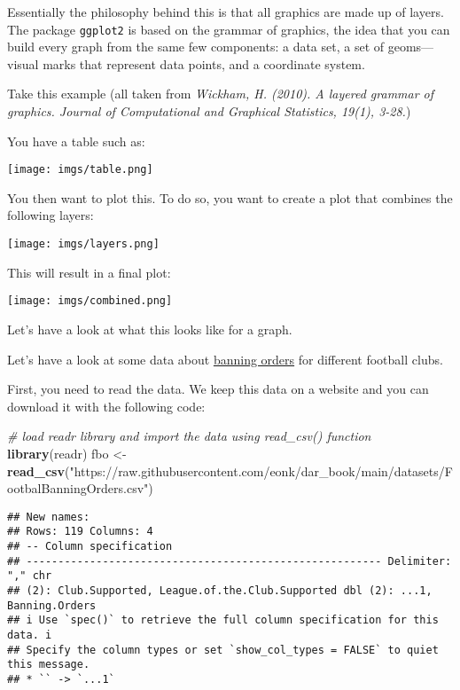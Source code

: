 \documentclass[
]{book}
\newenvironment{Shaded}{\begin{snugshade}}{\end{snugshade}}
\newcommand{\CommentTok}[1]{\textcolor[rgb]{0.56,0.35,0.01}{\textit{#1}}}
\newcommand{\FunctionTok}[1]{\textcolor[rgb]{0.13,0.29,0.53}{\textbf{#1}}}
\newcommand{\NormalTok}[1]{#1}
\newcommand{\OtherTok}[1]{\textcolor[rgb]{0.56,0.35,0.01}{#1}}
\newcommand{\StringTok}[1]{\textcolor[rgb]{0.31,0.60,0.02}{#1}}
\begin{document}
Essentially the philosophy behind this is that all graphics are made up of layers. The package \texttt{ggplot2} is based on the grammar of graphics, the idea that you can build every graph from the same few components: a data set, a set of geoms---visual marks that represent data points, and a coordinate system.

Take this example (all taken from \emph{Wickham, H. (2010). A layered grammar of graphics. Journal of Computational and Graphical Statistics, 19(1), 3-28.})

You have a table such as:

\texttt{[image: imgs/table.png]}

You then want to plot this. To do so, you want to create a plot that combines the following layers:

\texttt{[image: imgs/layers.png]}

This will result in a final plot:

\texttt{[image: imgs/combined.png]}

Let's have a look at what this looks like for a graph.

Let's have a look at some data about \href{https://www.gov.uk/government/publications/football-related-arrests-and-banning-orders-england-and-wales-season-2016-to-2017/football-related-arrests-and-banning-order-statistics-england-and-wales-2016-to-2017-season}{banning orders} for different football clubs.

First, you need to read the data. We keep this data on a website and you can download it with the following code:

\begin{Shaded}
\begin{Highlighting}[]
\CommentTok{\# load readr library and import the data using read\_csv() function}
\FunctionTok{library}\NormalTok{(readr)}
\NormalTok{fbo }\OtherTok{\textless{}{-}} \FunctionTok{read\_csv}\NormalTok{(}\StringTok{"https://raw.githubusercontent.com/eonk/dar\_book/main/datasets/FootbalBanningOrders.csv"}\NormalTok{)}
\end{Highlighting}
\end{Shaded}

\begin{verbatim}
## New names:
## Rows: 119 Columns: 4
## -- Column specification
## -------------------------------------------------------- Delimiter: "," chr
## (2): Club.Supported, League.of.the.Club.Supported dbl (2): ...1, Banning.Orders
## i Use `spec()` to retrieve the full column specification for this data. i
## Specify the column types or set `show_col_types = FALSE` to quiet this message.
## * `` -> `...1`
\end{verbatim}
\end{document}
